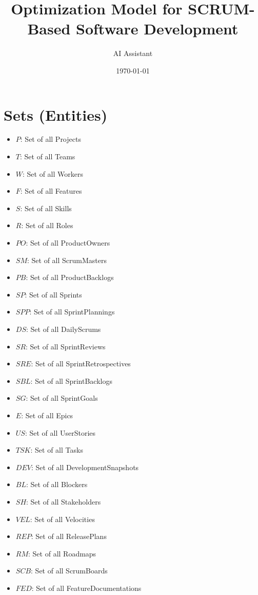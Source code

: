 \documentclass[11pt]{article}
\title{Optimization Model for SCRUM-Based Software Development}
\author{AI Assistant}
\date{\today}
\begin{document}
\maketitle
\tableofcontents
\newpage

\section{Sets (Entities)}
\begin{itemize}
    \item $P$: Set of all Projects
    \item $T$: Set of all Teams
    \item $W$: Set of all Workers
    \item $F$: Set of all Features
    \item $S$: Set of all Skills
    \item $R$: Set of all Roles
    \item $PO$: Set of all ProductOwners
    \item $SM$: Set of all ScrumMasters
    \item $PB$: Set of all ProductBacklogs
    \item $SP$: Set of all Sprints
    \item $SPP$: Set of all SprintPlannings
    \item $DS$: Set of all DailyScrums
    \item $SR$: Set of all SprintReviews
    \item $SRE$: Set of all SprintRetrospectives
    \item $SBL$: Set of all SprintBacklogs
    \item $SG$: Set of all SprintGoals
    \item $E$: Set of all Epics
    \item $US$: Set of all UserStories
    \item $TSK$: Set of all Tasks
    \item $DEV$: Set of all DevelopmentSnapshots
    \item $BL$: Set of all Blockers
    \item $SH$: Set of all Stakeholders
    \item $VEL$: Set of all Velocities
    \item $REP$: Set of all ReleasePlans
    \item $RM$: Set of all Roadmaps
    \item $SCB$: Set of all ScrumBoards
    \item $FED$: Set of all FeatureDocumentations
\end{itemize}
\end{document}
